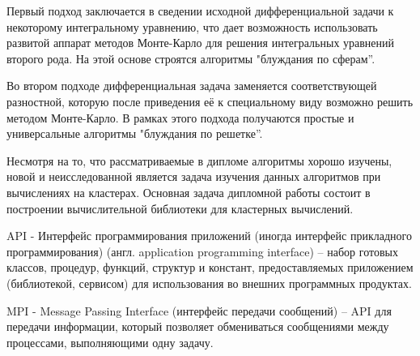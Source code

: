 Первый подход заключается в сведении исходной дифференциальной задачи к некоторому интегральному уравнению, что дает возможность использовать развитой аппарат методов Монте-Карло для решения интегральных уравнений второго рода. На этой основе строятся алгоритмы "блуждания по сферам''.
   
Во втором подходе дифференциальная задача заменяется соответствующей разностной,
которую после приведения её к специальному виду возможно решить
методом Монте-Карло. В рамках этого подхода получаются простые и универсальные алгоритмы "блуждания по решетке''.

Несмотря на то, что рассматриваемые в дипломе алгоритмы хорошо изучены, новой и неисследованной является задача изучения данных алгоритмов при вычислениях на кластерах. Основная задача дипломной работы состоит в  построении вычислительной библиотеки для кластерных вычислений.  

\newpage{} %

API - Интерфейс программирования приложений (иногда интерфейс прикладного программирования) (англ. application programming interface) -- набор готовых классов, процедур, функций, структур и констант, предоставляемых приложением (библиотекой, сервисом) для использования во внешних программных продуктах. 

MPI - Message Passing Interface (интерфейс передачи сообщений) -- API для передачи информации, который позволяет обмениваться сообщениями между процессами, выполняющими одну задачу.












